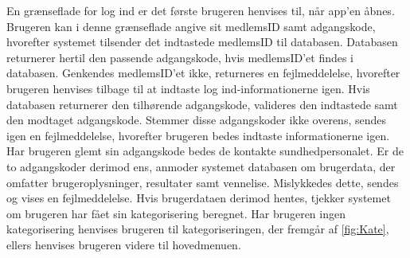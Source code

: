 \noindent
En grænseflade for log ind er det første brugeren henvises til, når app'en åbnes. Brugeren kan i denne grænseflade angive sit medlemsID samt adgangskode, hvorefter systemet tilsender det indtastede medlemsID til databasen. Databasen returnerer hertil den passende adgangskode, hvis medlemsID'et findes i databasen. Genkendes medlemsID'et ikke, returneres en fejlmeddelelse, hvorefter brugeren henvises tilbage til at indtaste log ind-informationerne igen. Hvis databasen returnerer den tilhørende adgangskode, valideres den indtastede samt den modtaget adgangskode. Stemmer disse adgangskoder ikke overens, sendes igen en fejlmeddelelse, hvorefter brugeren bedes indtaste informationerne igen. Har brugeren glemt sin adgangskode bedes de kontakte sundhedpersonalet. Er de to adgangskoder derimod ens, anmoder systemet databasen om brugerdata, der omfatter brugeroplysninger, resultater samt vennelise. Mislykkedes dette, sendes og vises en fejlmeddelelse. Hvis brugerdataen derimod hentes, tjekker systemet om brugeren har fået sin kategorisering beregnet. Har brugeren ingen kategorisering henvises brugeren til kategoriseringen, der fremgår af \autoref{fig:Kate}, ellers henvises brugeren videre til hovedmenuen.


   


